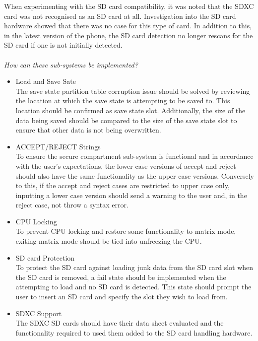 When experimenting with the SD card compatibility, it was noted that the SDXC card was not recognised as an SD card at all. Investigation into the SD card hardware showed that there was no case for this type of card. 
In addition to this, in the latest version of the phone, the SD card detection no longer rescans for the SD card if one is not initially detected.\\
\\
\textit{How can these sub-systems be implemented?}\\
\begin{itemize}
\item{Load and Save Sate}\\
  The save state partition table corruption issue should be solved by reviewing the location at which the save state is attempting to be saved to. 
  This location should be confirmed as save state slot. 
  Additionally, the size of the data being saved should be compared to the size of the save state slot to ensure that other data is not being overwritten.
\item{ACCEPT/REJECT Strings}\\
  To ensure the secure compartment sub-system is functional and in accordance with the user's expectations, the lower case versions of accept and reject should also have the same functionality as the upper case versions. 
  Conversely to this, if the accept and reject cases are restricted to upper case only, inputting a lower case version should send a warning to the user and, in the reject case, not throw a syntax error.
\item{CPU Locking}\\
  To prevent CPU locking and restore some functionality to matrix mode, exiting matrix mode should be tied into unfreezing the CPU.
\item{SD card Protection}\\
  To protect the SD card against loading junk data from the SD card slot when the SD card is removed, a fail state should be implemented when the attempting to load and no SD card is detected. This state should prompt the user to insert an SD card and specify the slot they wish to load from.
\item{SDXC Support}\\
  The SDXC SD cards should have their data sheet evaluated and the functionality required to used them added to the SD card handling hardware.
\end{itemize}

